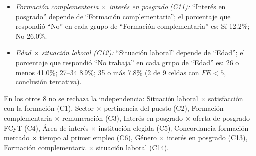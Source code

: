 \begin{enumerate}
\begin{itemize}[nosep]
    \item \emph{Formación complementaria $\times$ interés en posgrado (C11):} ``Interés en posgrado'' depende de ``Formación complementaria''; el porcentaje que respondió ``No'' en cada grupo de ``Formación complementaria'' es: Sí 12.2\%; No 26.0\%.
    \item \emph{Edad $\times$ situación laboral (C12):} ``Situación laboral'' depende de ``Edad''; el porcentaje que respondió ``No trabaja'' en cada grupo de ``Edad'' es: 26 o menos 41.0\%; 27–34 8.9\%; 35 o más 7.8\% (2 de 9 celdas con $FE<5$, conclusión tentativa).
  \end{itemize}
  En los otros 8 no se rechaza la independencia: Situación laboral $\times$ satisfacción con la formación (C1), Sector $\times$ pertinencia del puesto (C2), Formación complementaria $\times$ remuneración (C3), Interés en posgrado $\times$ oferta de posgrado FCyT (C4), Área de interés $\times$ institución elegida (C5), Concordancia formación–mercado $\times$ tiempo al primer empleo (C6), Género $\times$ interés en posgrado (C13), Formación complementaria $\times$ situación laboral (C14).
\end{enumerate}

